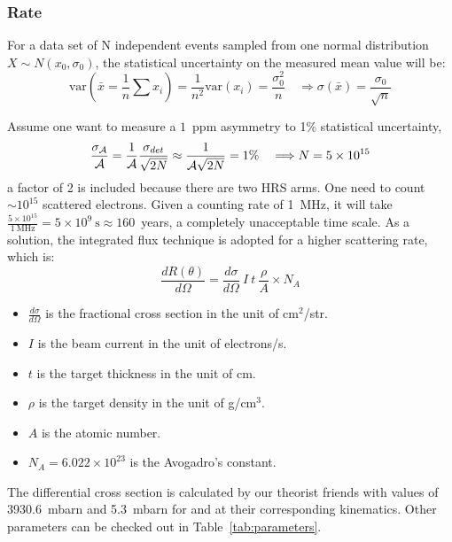 \subsubsection{Rate}
For a data set of N independent events sampled from one normal distribution 
$X\sim N(x_0, \sigma_0)$, the statistical uncertainty on the measured mean value
will be:
$$ \text{var}(\bar{x} = \frac{1}{n}\sum x_i) = \frac{1}{n^2}\text{var}(x_i) = \frac{\sigma_0^2}{n} 
\quad \Longrightarrow \sigma(\bar{x}) = \frac{\sigma_0}{\sqrt{n}} $$

Assume one want to measure a $1$~ppm asymmetry to 1\% statistical uncertainty,
\begin{equation}
    \frac{\sigma_{\mathcal{A}}}{\mathcal{A}} = \frac{1}{\mathcal{A}}\frac{\sigma_{det}}{\sqrt{2N}} 
    \approx \frac{1}{\mathcal{A}\sqrt{2N}} = 1\% \quad 
    \Longrightarrow N = 5 \times 10^{15} 
    \label{eq:statistical_error}
\end{equation}
a factor of 2 is included because there are two HRS arms.
One need to count $\sim10^{15}$ scattered electrons. Given a counting rate of 1~MHz, 
it will take $\frac{5\times 10^{15}}{1\ \mathrm{MHz}} = 5\times 10^{9}\ \mathrm{s} \approx 160$~years,
a completely unacceptable time scale. As a solution, the integrated flux technique is
adopted for a higher scattering rate, which is:
\begin{equation}
    \frac{dR(\theta)}{d\Omega} = \frac{d\sigma}{d\Omega}\ I\ t\ \frac{\rho}{A} \times N_A   
\end{equation}
\begin{itemize}
    \item $\frac{d\sigma}{d\Omega}$ is the fractional cross section in the unit of $\mathrm{cm}^2$/str.
    \item $I$ is the beam current in the unit of electrons/s.
    \item $t$ is the target thickness in the unit of cm.
    \item $\rho$ is the target density in the unit of g/cm${}^3$.
    \item $A$ is the atomic number.
    \item $N_A = 6.022\times 10^{23}$ is the Avogadro's constant.
\end{itemize}

The differential cross section is calculated by our theorist friends
with values of 3930.6~mbarn and 5.3~mbarn for \Pb and \Ca at their corresponding
kinematics. Other parameters can be checked out in Table~\ref{tab:parameters}.

